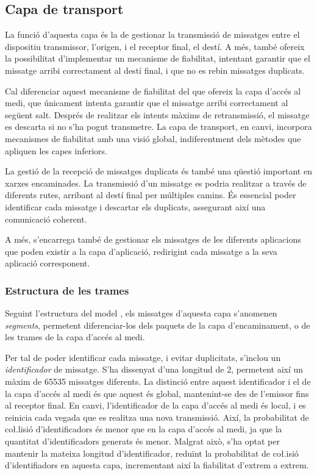 \documentclass{tfgitic}[2024/07/01]
\begin{document}
{\subsection{Capa de transport}
La funció d'aquesta capa és la de gestionar la transmissió de missatges entre el dispositiu transmissor, l'origen, i el receptor final, el destí. A més, també ofereix la possibilitat d'implementar un mecanisme de fiabilitat, intentant garantir que el missatge arribi correctament al destí final, i que no es rebin missatges duplicats. 

Cal diferenciar aquest mecanisme de fiabilitat del que ofereix la capa d'accés al medi, que únicament intenta garantir que el missatge arribi correctament al següent salt. Després de realitzar els intents màxims de retransmissió, el missatge es descarta si no s'ha pogut transmetre. La capa de transport, en canvi, incorpora mecanismes de fiabilitat amb una visió global, indiferentment dels mètodes que apliquen les capes inferiors.

La gestió de la recepció de missatges duplicats és també una qüestió important en xarxes encaminades. La transmissió d'un missatge es podria realitzar a través de diferents rutes, arribant al destí final per múltiples camins. És essencial poder identificar cada missatge i descartar els duplicats, assegurant així una comunicació coherent. 

A més, s'encarrega també de gestionar els missatges de les diferents aplicacions que poden existir a la capa d'aplicació, redirigint cada missatge a la seva aplicació corresponent.


\subsubsection{Estructura de les trames}
Seguint l'estructura del model , els missatges d'aquesta capa s'anomenen \emph{segments}, permetent diferenciar-los dels paquets de la capa d'encaminament, o de les trames de la capa d'accés al medi. 

Per tal de poder identificar cada missatge, i evitar duplicitats, s'inclou un \emph{identificador} de missatge. S'ha dissenyat d'una longitud de \SI{2}{\byte}, permetent així un màxim de \num{65535} missatges diferents. La distinció entre aquest identificador i el de la capa d'accés al medi és que aquest és global, mantenint-se des de l'emissor fins al receptor final. En canvi, l'identificador de la capa d'accés al medi és local, i es reinicia cada vegada que es realitza una nova transmissió. Així, la probabilitat de co\l.lisió d'identificadors és menor que en la capa d'accés al medi, ja que la quantitat d'identificadors generats és menor. Malgrat això, s'ha optat per mantenir la mateixa longitud d'identificador, reduïnt la probabilitat de co\l.isió d'identifiadors en aquesta capa, incrementant així la fiabilitat d'extrem a extrem. 

}
\end{document}
